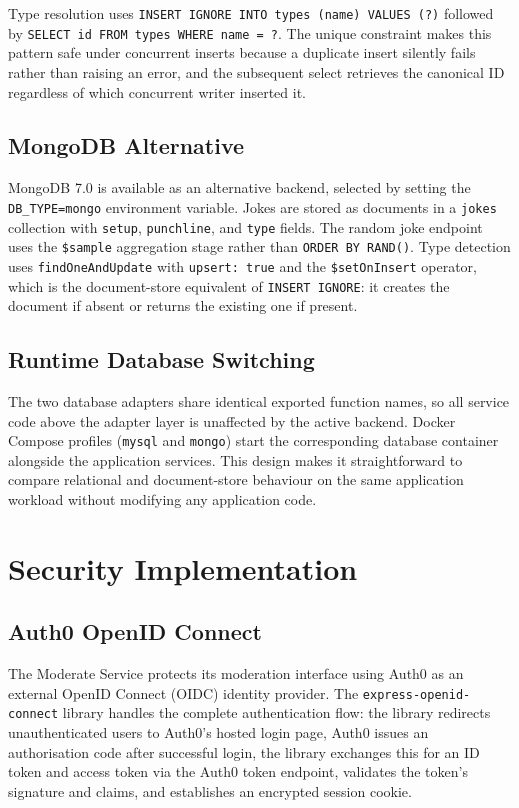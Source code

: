 \documentclass[12pt,a4paper]{article}
\begin{document}
Type resolution uses \texttt{INSERT IGNORE INTO types (name) VALUES (?)} followed by \texttt{SELECT id FROM types WHERE name = ?}. The unique constraint makes this pattern safe under concurrent inserts because a duplicate insert silently fails rather than raising an error, and the subsequent select retrieves the canonical ID regardless of which concurrent writer inserted it.

\subsection{MongoDB Alternative}

MongoDB 7.0 is available as an alternative backend, selected by setting the \texttt{DB\_TYPE=mongo} environment variable. Jokes are stored as documents in a \texttt{jokes} collection with \texttt{setup}, \texttt{punchline}, and \texttt{type} fields. The random joke endpoint uses the \texttt{\$sample} aggregation stage rather than \texttt{ORDER BY RAND()}. Type detection uses \texttt{findOneAndUpdate} with \texttt{upsert: true} and the \texttt{\$setOnInsert} operator, which is the document-store equivalent of \texttt{INSERT IGNORE}: it creates the document if absent or returns the existing one if present.

\subsection{Runtime Database Switching}

The two database adapters share identical exported function names, so all service code above the adapter layer is unaffected by the active backend. Docker Compose profiles (\texttt{mysql} and \texttt{mongo}) start the corresponding database container alongside the application services. This design makes it straightforward to compare relational and document-store behaviour on the same application workload without modifying any application code.

\section{Security Implementation}

\subsection{Auth0 OpenID Connect}

The Moderate Service protects its moderation interface using Auth0 as an external OpenID Connect (OIDC) identity provider. The \texttt{express-openid-connect} library handles the complete authentication flow: the library redirects unauthenticated users to Auth0's hosted login page, Auth0 issues an authorisation code after successful login, the library exchanges this for an ID token and access token via the Auth0 token endpoint, validates the token's signature and claims, and establishes an encrypted session cookie.
\end{document}
